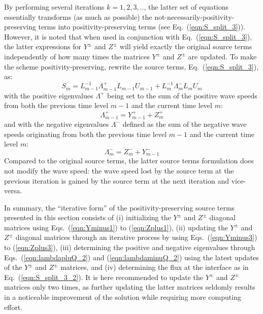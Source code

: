 \documentclass{warpdoc}
\begin{document}
%
By performing several iterations $k=1,2,3,..$, the latter set of equations essentially transforms (as much as possible) the not-necessarily-positivity-preserving terms into positivity-preserving terms (see Eq.\ (\ref{eqn:S_split_3})). However, it is noted that when used in conjunction with Eq.\ (\ref{eqn:S_split_3}), the latter expressions for $Y^\pm$ and $Z^\pm$ will yield exactly the original source terms independently of how many times the matrices $Y^\pm$ and $Z^\pm$ are updated. To make the scheme positivity-preserving, rewrite the source terms, Eq.\ (\ref{eqn:S_split_3}), as:
%
\begin{equation}
S_{m}=
 L^{-1}_{m-1} \Lambda^+_{m-1} L_{m-1} U_{m-1} 
+ L^{-1}_{m} \Lambda^-_{m} L_{m} U_{m}
\label{eqn:S_split_3_2}
\end{equation}
%
with the positive eigenvalues $\Lambda^+$ being set to the sum of the positive wave speeds from both the previous time level $m-1$ and the current time level $m$:  
%
\begin{equation}
\Lambda_{m-1}^+ = Y^+_{m-1} + Z^+_{m} 
\label{eqn:lambdapluQ_2}
\end{equation}
%
and with the negative eigenvalues $\Lambda^-$ defined as the sum of the negative wave speeds originating from both the previous time level $m-1$ and the current time level $m$:
%
\begin{equation}
\Lambda_{m}^- = Z^-_{m} + Y^-_{m-1} 
\label{eqn:lambdaminuQ_2}
\end{equation}
%
Compared to the original source terms, the latter source terms formulation does not modify the wave speed:  the wave speed lost by the source term at the previous iteration is gained by the source term at the next iteration and vice-versa. 

In summary, the ``iterative form'' of the positivity-preserving source terms presented in this section consists of (i) initializing the $Y^\pm$ and $Z^\pm$ diagonal matrices using Eqs.\ (\ref{eqn:Yminus1}) to (\ref{eqn:Zplus1}), (ii) updating the $Y^\pm$ and $Z^\pm$ diagonal matrices through an iterative process by using Eqs.\ (\ref{eqn:Yminus3}) to (\ref{eqn:Zplus3}), (iii) determining the positive and negative eigenvalues through Eqs.\ (\ref{eqn:lambdapluQ_2}) and (\ref{eqn:lambdaminuQ_2}) using the latest updates of the $Y^\pm$ and $Z^\pm$ matrices, and (iv) determining the flux at the interface as in Eq.\ (\ref{eqn:S_split_3_2}). It is here recommended to update the $Y^\pm$ and $Z^\pm$ matrices only two times, as further updating the latter matrices seldomly results in a noticeable improvement of the solution while requiring more computing effort. 
\end{document}
